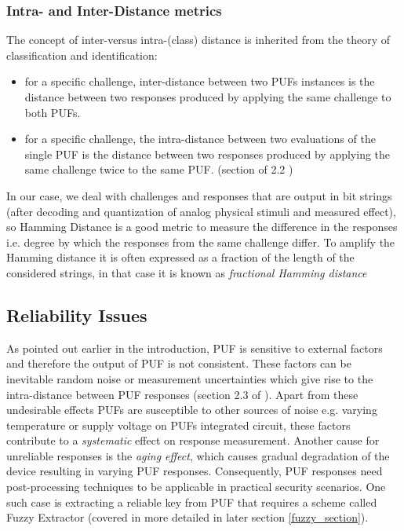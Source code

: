 \subsubsection{Intra- and Inter-Distance metrics}
\label{intra_inter_section}
The concept of inter-versus intra-(class) distance is inherited from the theory of classification and identification:
\begin{itemize}
	\item for a specific challenge, inter-distance between two PUFs instances is the distance between two responses produced by applying the same challenge to both PUFs.
	\item for a specific challenge, the intra-distance between two evaluations of the single PUF is the distance between two responses produced by applying the same challenge twice to the same PUF. (section of 2.2 \cite{thbook})
\end{itemize}

In our case, we deal with challenges and responses that are output in bit strings (after decoding and quantization of analog physical stimuli and measured effect), so Hamming Distance is a good metric to measure the difference in the responses i.e. degree by which the responses from the same challenge differ. To amplify the Hamming distance it is often expressed as a fraction of the length of the considered strings, in that case it is known as \emph{fractional Hamming distance}

\subsection{Reliability Issues}
As pointed out earlier in the introduction, PUF is sensitive to external factors and therefore the output of PUF is not consistent. These factors can be inevitable random noise or measurement uncertainties which give rise to the intra-distance between PUF responses (section 2.3 of \cite{thbook}). Apart from these undesirable effects PUFs are susceptible to other sources of noise e.g. varying temperature or supply voltage on PUFs integrated circuit, these factors contribute to a \emph{systematic} effect on
response measurement. Another cause for unreliable responses is the \emph{aging effect}, which causes gradual degradation of the device resulting in varying PUF responses. Consequently, PUF responses need post-processing techniques to be applicable in practical security scenarios. One such case is extracting a reliable key from PUF that requires a scheme called Fuzzy Extractor (covered in more detailed in later section \ref{fuzzy_section}).

